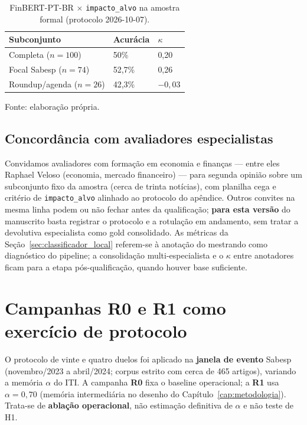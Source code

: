 \begin{table}[htbp]
\caption{FinBERT-PT-BR $\times$ \texttt{impacto\_alvo} na amostra formal (protocolo 2026-10-07).}
\label{tab:kappa_formal}
\begin{tabular}{|p{}|p{}|p{}|}
\hline
\textbf{Subconjunto} & \textbf{Acurácia} & \textbf{$\kappa$} \\
\hline
Completa ($n=100$) & 50\% & 0,20 \\
\hline
Focal Sabesp ($n=74$) & 52,7\% & 0,26 \\
\hline
Roundup/agenda ($n=26$) & 42,3\% & $-0{,}03$ \\
\hline
\end{tabular}

\vspace{0.4em}
{\footnotesize Fonte: elaboração própria.}

\end{table}

\subsection{Concordância com avaliadores especialistas}

Convidamos avaliadores com formação em economia e finanças --- entre eles Raphael Veloso (economia, mercado financeiro) --- para segunda opinião sobre um subconjunto fixo da amostra (cerca de trinta notícias), com planilha cega e critério de \texttt{impacto\_alvo} alinhado ao protocolo do apêndice. Outros convites na mesma linha podem ou não fechar antes da qualificação; \textbf{para esta versão} do manuscrito basta registrar o protocolo e a rotulação em andamento, sem tratar a devolutiva especialista como gold consolidado. As métricas da Seção~\ref{sec:classificador_local} referem-se à anotação do mestrando como diagnóstico do pipeline; a consolidação multi-especialista e o $\kappa$ entre anotadores ficam para a etapa pós-qualificação, quando houver base suficiente.

\section{Campanhas R0 e R1 como exercício de protocolo}
\label{sec:campanhas_r0_r1}

O protocolo de vinte e quatro duelos foi aplicado na \textbf{janela de evento} Sabesp (novembro/2023 a abril/2024; corpus estrito com cerca de 465 artigos), variando a memória $\alpha$ do ITI. A campanha \textbf{R0} fixa o baseline operacional; a \textbf{R1} usa $\alpha = 0{,}70$ (memória intermediária no desenho do Capítulo~\ref{cap:metodologia}). Trata-se de \textbf{ablação operacional}, não estimação definitiva de $\alpha$ e não teste de H1.

